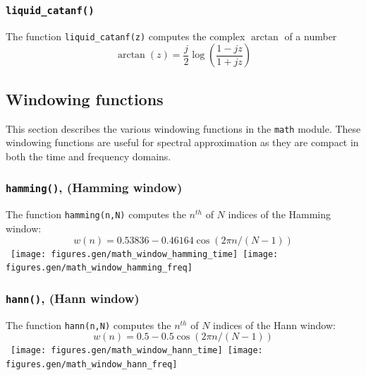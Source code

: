 \subsubsection{{\tt liquid\_catanf()}}
\label{module:math:complex:catanf}
The function {\tt liquid\_catanf(z)}
computes the complex $\arctan$ of a number
%
\begin{equation}
\label{eqn:math:catanf}
    \arctan(z) =
        \frac{j}{2}
        \log\left( \frac{1-jz}{1+jz} \right)
\end{equation}
%


% 
%
\subsection{Windowing functions}
\label{module:math:window}
This section describes the various windowing functions in the {\tt math}
module.
These windowing functions are useful for spectral approximation as they
are compact in both the time and frequency domains.

\subsubsection{{\tt hamming()}, (Hamming window)}
\label{module:math:window:hamming}
The function {\tt hamming(n,N)} computes the $n^{th}$ of $N$ indices of
the Hamming window:
%
\begin{equation}
\label{eqn:math:window:hamming}
    w(n) = 0.53836 - 0.46164 \cos\left( 2 \pi n / (N-1) \right)
\end{equation}
%
% 
\mbox{
  \centering
  \texttt{[image: figures.gen/math\_window\_hamming\_time]}
  \quad
  \texttt{[image: figures.gen/math\_window\_hamming\_freq]}
}

\subsubsection{{\tt hann()}, (Hann window)}
\label{module:math:window:hann}
The function {\tt hann(n,N)} computes the $n^{th}$ of $N$ indices of
the Hann window:
%
\begin{equation}
\label{eqn:math:window:hann}
    w(n) = 0.5 - 0.5 \cos\left( 2 \pi n / (N-1) \right)
\end{equation}
%
% 
\mbox{
  \centering
  \texttt{[image: figures.gen/math\_window\_hann\_time]}
  \quad
  \texttt{[image: figures.gen/math\_window\_hann\_freq]}
}
%


